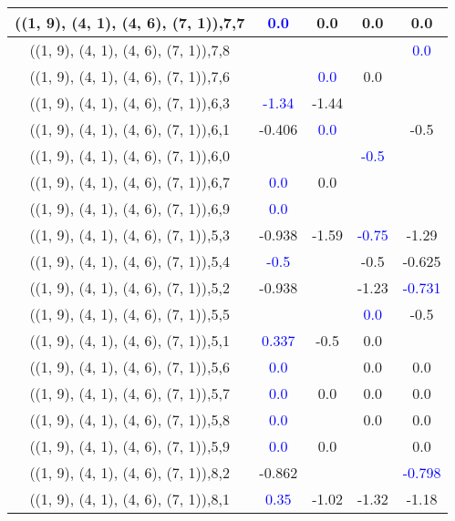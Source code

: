 \documentclass{article}
\begin{document}
\begin{center}
\begin{longtable}{|c|c|c|c|c|}
        	\hline
        	((1, 9), (4, 1), (4, 6), (7, 1)),7,7& \textcolor{blue}{0.0}&0.0&0.0&0.0\\
        	\hline
        	((1, 9), (4, 1), (4, 6), (7, 1)),7,8&&&& \textcolor{blue}{0.0}\\
        	\hline
        	((1, 9), (4, 1), (4, 6), (7, 1)),7,6&& \textcolor{blue}{0.0}&0.0&\\
        	\hline
        	((1, 9), (4, 1), (4, 6), (7, 1)),6,3& \textcolor{blue}{-1.34}&-1.44&&\\
        	\hline
        	((1, 9), (4, 1), (4, 6), (7, 1)),6,1&-0.406& \textcolor{blue}{0.0}&&-0.5\\
        	\hline
        	((1, 9), (4, 1), (4, 6), (7, 1)),6,0&&& \textcolor{blue}{-0.5}&\\
        	\hline
        	((1, 9), (4, 1), (4, 6), (7, 1)),6,7& \textcolor{blue}{0.0}&0.0&&\\
        	\hline
        	((1, 9), (4, 1), (4, 6), (7, 1)),6,9& \textcolor{blue}{0.0}&&&\\
        	\hline
        	((1, 9), (4, 1), (4, 6), (7, 1)),5,3&-0.938&-1.59& \textcolor{blue}{-0.75}&-1.29\\
        	\hline
        	((1, 9), (4, 1), (4, 6), (7, 1)),5,4& \textcolor{blue}{-0.5}&&-0.5&-0.625\\
        	\hline
        	((1, 9), (4, 1), (4, 6), (7, 1)),5,2&-0.938&&-1.23& \textcolor{blue}{-0.731}\\
        	\hline
        	((1, 9), (4, 1), (4, 6), (7, 1)),5,5&&& \textcolor{blue}{0.0}&-0.5\\
        	\hline
        	((1, 9), (4, 1), (4, 6), (7, 1)),5,1& \textcolor{blue}{0.337}&-0.5&0.0&\\
        	\hline
        	((1, 9), (4, 1), (4, 6), (7, 1)),5,6& \textcolor{blue}{0.0}&&0.0&0.0\\
        	\hline
        	((1, 9), (4, 1), (4, 6), (7, 1)),5,7& \textcolor{blue}{0.0}&0.0&0.0&0.0\\
        	\hline
        	((1, 9), (4, 1), (4, 6), (7, 1)),5,8& \textcolor{blue}{0.0}&&0.0&0.0\\
        	\hline
        	((1, 9), (4, 1), (4, 6), (7, 1)),5,9& \textcolor{blue}{0.0}&0.0&&0.0\\
        	\hline
        	((1, 9), (4, 1), (4, 6), (7, 1)),8,2&-0.862&&& \textcolor{blue}{-0.798}\\
        	\hline
        	((1, 9), (4, 1), (4, 6), (7, 1)),8,1& \textcolor{blue}{0.35}&-1.02&-1.32&-1.18\\

\end{longtable}
\end{center}
\end{document}
